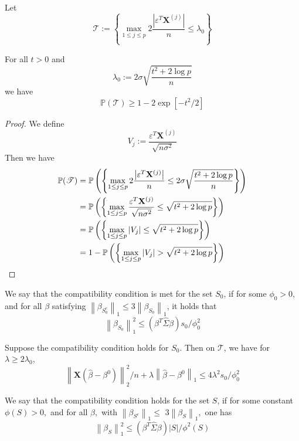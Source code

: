Let
$$\mathscr{T} := \left\{\max _{1 \leq j \leq p} 2 \frac{\left| \varepsilon^{T} \mathbf{X}^{(j)}\right|}{n} \leq \lambda_{0}\right\}$$

\begin{lemma}[Lemma 6.2.]
    For all $t > 0$ and
    $$\lambda_{0}:=2 \sigma \sqrt{\frac{t^{2}+2 \log p}{n}}$$
    we have
    $$\mathbb{P}(\mathscr{T}) \geq 1-2 \exp \left[-t^{2} / 2\right]$$
\end{lemma}
\begin{proof}
    We define
    $$V_{j} := \frac{\varepsilon^{T} \mathbf{X}^{(j)}}{\sqrt{n \sigma^{2}}}$$
    Then we have
    \begin{align*}
        \mathbb{P}(\mathscr{T}) & = \P \left( \left\{\max _{1 \leq j \leq p} 2 \frac{\left| \varepsilon^{T} \mathbf{X}^{(j)}\right|}{n} \leq 2 \sigma \sqrt{\frac{t^{2}+2 \log p}{n}} \right\} \right) \\
                                & =
        \P \left( \left\{\max _{1 \leq j \leq p} \frac{\varepsilon^{T} \mathbf{X}^{(j)}}{\sqrt{n \sigma^{2}}} \leq \sqrt{t^{2}+2 \log p} \right\} \right)                                              \\
                                & =
        \P \left( \left\{\max _{1 \leq j \leq p} | V_{j} | \leq \sqrt{t^{2}+2 \log p} \right\} \right)                                                                                                 \\
                                & =
        1 - \P \left( \left\{\max _{1 \leq j \leq p} | V_{j} | > \sqrt{t^{2}+2 \log p} \right\} \right)                                                                                                \\
    \end{align*}
\end{proof}


\begin{theorem}
    We say that the compatibility condition is met for the set $S_{0}$, if for some $\phi_{0}>0$, and for all $\beta$ satisfying $\left\|\beta_{S_{0}^{c}}\right\|_{1} \leq 3\left\|\beta_{S_{0}}\right\|_{1}$, it holds that
    $$
        \left\| \beta_{S_{0}} \right\|_{1}^{2} \leq\left(\beta^{T} \hat{\Sigma} \beta\right) s_{0} / \phi_{0}^{2}
    $$
\end{theorem}

\begin{theorem}[Theorem 6.1.]
    Suppose the compatibility condition holds for $S_{0}$. Then on $\mathscr{T}$, we have for $\lambda \geq 2 \lambda_{0}$,
    $$
        \left\|\mathbf{X}\left(\hat{\beta}-\beta^{0}\right)\right\|_{2}^{2} / n+\lambda\left\|\hat{\beta}-\beta^{0}\right\|_{1} \leq 4 \lambda^{2} s_{0} / \phi_{0}^{2}
    $$
\end{theorem}

\begin{theorem}
    We say that the compatibility condition holds for the set $S$, if for some constant $\phi(S)>0,$ and for all $\beta,$ with $\left\|\beta_{S^{c}}\right\|_{1} \leq$ $3\left\|\beta_{S}\right\|_{1},$ one has
    $$
        \left\|\beta_{S}\right\|_{1}^{2} \leq\left(\beta^{T} \hat{\Sigma} \beta\right)|S| / \phi^{2}(S)
    $$
\end{theorem}